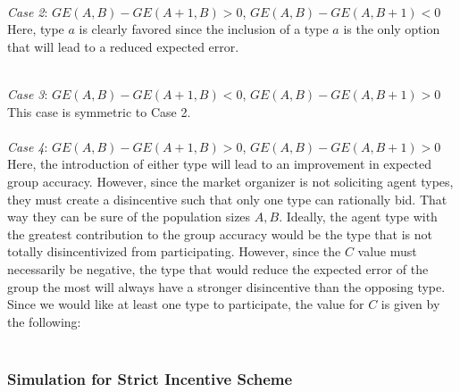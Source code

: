 \documentclass[twoside,twocolumn]{article}
\begin{document}
\\
\newline

\textit{Case 2}: $GE(A,B) - GE(A+1,B)>0$, $GE(A,B) - GE(A,B+1)<0$\\

Here, type $a$ is clearly favored since the inclusion of a type $a$ is the only option that will lead to a reduced expected error. \\

\\
\newline

\textit{Case 3}: $GE(A,B) - GE(A+1,B)<0$, $GE(A,B) - GE(A,B+1)>0$\\

This case is symmetric to Case 2.\\

\\
\newline
\textit{Case 4}: $GE(A,B) - GE(A+1,B)>0$, $GE(A,B) - GE(A,B+1)>0$\\

Here, the introduction of either type will lead to an improvement in expected group accuracy. However, since the market organizer is not soliciting agent types, they must create a disincentive such that only one type can rationally bid. That way they can be sure of the population sizes $A,B$. Ideally, the agent type with the greatest contribution to the group accuracy would be the type that is not totally disincentivized from participating. However, since the $C$ value must necessarily be negative, the type that would reduce the expected error of the group the most will always have a stronger disincentive than the opposing type. Since we would like at least one type to participate, the value for $C$ is given by the following:\\

\\

\subsubsection{Simulation for Strict Incentive Scheme}
\end{document}
